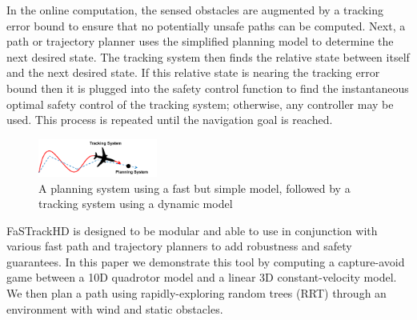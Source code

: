 In the online computation, the sensed obstacles are augmented by a tracking error bound to ensure that no potentially unsafe paths can be computed. Next, a path or trajectory planner uses the simplified planning model to determine the next desired state. The tracking system then finds the relative state between itself and the next desired state. If this relative state is nearing the tracking error bound then it is plugged into the safety control function to find the instantaneous optimal safety control of the tracking system; otherwise, any controller may be used. This process is repeated until the navigation goal is reached. 
  

\begin{figure}
	\centering
	\includegraphics[width=0.35\textwidth]{fig/chasing}
	\caption{A planning system using a fast but simple model, followed by a tracking system using a dynamic model}
	\label{fig:chasing}
	\vspace{-.2in}
\end{figure}
%
FaSTrackHD is designed to be modular and able to use in conjunction with various fast path and trajectory planners to add robustness and safety guarantees. In this paper we demonstrate this tool by computing a capture-avoid game between a 10D quadrotor model and a linear 3D constant-velocity model. We then plan a path using rapidly-exploring random trees (RRT) through an environment with wind and static obstacles.